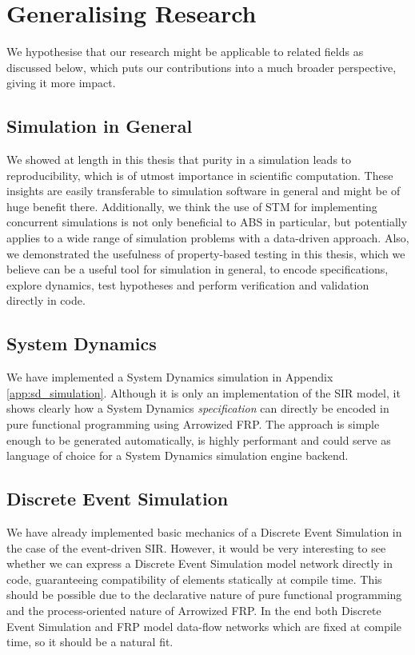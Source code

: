 \section{Generalising Research}
We hypothesise that our research might be applicable to related fields as discussed below, which puts our contributions into a much broader perspective, giving it more impact.

\subsection{Simulation in General}
We showed at length in this thesis that purity in a simulation leads to reproducibility, which is of utmost importance in scientific computation. These insights are easily transferable to simulation software in general and might be of huge benefit there.
Additionally, we think the use of STM for implementing concurrent simulations is not only beneficial to ABS in particular, but potentially applies to a wide range of simulation problems with a data-driven approach. Also, we demonstrated the usefulness of property-based testing in this thesis, which we believe can be a useful tool for simulation in general, to encode specifications, explore dynamics, test hypotheses and perform verification and validation directly in code.

\subsection{System Dynamics}
We have implemented a System Dynamics simulation in Appendix \ref{app:sd_simulation}. Although it is only an implementation of the SIR model, it shows clearly how a System Dynamics \textit{specification} can directly be encoded in pure functional programming using Arrowized FRP. The approach is simple enough to be generated automatically, is highly performant and could serve as language of choice for a System Dynamics simulation engine backend.

\subsection{Discrete Event Simulation}
We have already implemented basic mechanics of a Discrete Event Simulation in the case of the event-driven SIR. However, it would be very interesting to see whether we can express a Discrete Event Simulation model network directly in code, guaranteeing compatibility of elements statically at compile time. This should be possible due to the declarative nature of pure functional programming and the process-oriented nature of Arrowized FRP. In the end both Discrete Event Simulation and FRP model data-flow networks which are fixed at compile time, so it should be a natural fit.

